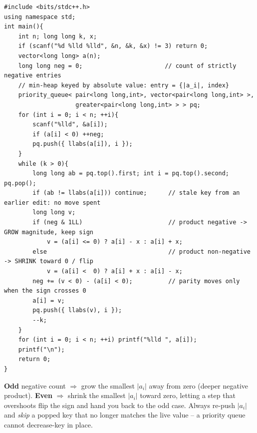 \begin{lstlisting}[caption={Maxim and Array -- extract-min by |.|, move by +/-x under the negative-parity rule, reinsert with lazy stale-skip (Codeforces 721D; O((n+k) log n), long long)}, label={lst:c07-summit}]
#include <bits/stdc++.h>
using namespace std;
int main(){
    int n; long long k, x;
    if (scanf("%d %lld %lld", &n, &k, &x) != 3) return 0;
    vector<long long> a(n);
    long long neg = 0;                       // count of strictly negative entries
    // min-heap keyed by absolute value: entry = {|a_i|, index}
    priority_queue< pair<long long,int>, vector<pair<long long,int> >,
                    greater<pair<long long,int> > > pq;
    for (int i = 0; i < n; ++i){
        scanf("%lld", &a[i]);
        if (a[i] < 0) ++neg;
        pq.push({ llabs(a[i]), i });
    }
    while (k > 0){
        long long ab = pq.top().first; int i = pq.top().second; pq.pop();
        if (ab != llabs(a[i])) continue;      // stale key from an earlier edit: no move spent
        long long v;
        if (neg & 1LL)                        // product negative -> GROW magnitude, keep sign
            v = (a[i] <= 0) ? a[i] - x : a[i] + x;
        else                                  // product non-negative -> SHRINK toward 0 / flip
            v = (a[i] <  0) ? a[i] + x : a[i] - x;
        neg += (v < 0) - (a[i] < 0);          // parity moves only when the sign crosses 0
        a[i] = v;
        pq.push({ llabs(v), i });
        --k;
    }
    for (int i = 0; i < n; ++i) printf("%lld ", a[i]);
    printf("\n");
    return 0;
}
\end{lstlisting}
\begin{notebox}
\textbf{Odd} negative count $\Rightarrow$ grow the smallest $|a_i|$ away from zero (deeper negative product).
\textbf{Even} $\Rightarrow$ shrink the smallest $|a_i|$ toward zero, letting a step that overshoots flip the
sign and hand you back to the odd case. Always re-push $|a_i|$ and \emph{skip} a popped key that no longer
matches the live value -- a priority queue cannot decrease-key in place.
\end{notebox}

